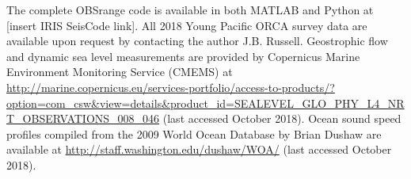 The complete OBSrange code is available in both MATLAB and Python at [insert IRIS SeisCode link]. All 2018 Young Pacific ORCA survey data are available upon request by contacting the author J.B. Russell. Geostrophic flow and dynamic sea level measurements are provided by Copernicus
Marine Environment Monitoring Service (CMEMS) at \href{http://marine.copernicus.eu/services-portfolio/access-to-products/?option=com_csw\&view=details\&product_id=SEALEVEL_GLO_PHY_L4_NRT_OBSERVATIONS_008_046}{http://marine.copernicus.eu/services-portfolio/access-to-products/?option=com\_csw\&view=details\&product\_id=SEALEVEL\_GLO\_PHY\_L4\_NRT\_OBSERVATIONS\_008\_046} (last accessed October 2018). Ocean sound speed profiles compiled from the 2009 World Ocean Database by Brian Dushaw are available at \href{http://staff.washington.edu/dushaw/WOA/}{http://staff.washington.edu/dushaw/WOA/} (last accessed October 2018).